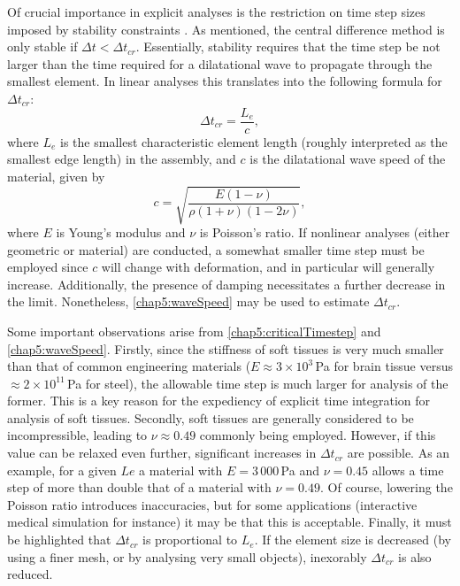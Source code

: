 \bigskip

Of crucial importance in explicit analyses is the restriction on time step sizes imposed by stability constraints \label{chap5:discussionTimestep}. As mentioned, the central difference method is only stable if $ \Delta t <  \Delta t_{cr} $. Essentially, stability requires that the time step be not larger than the time required for a dilatational wave to propagate through the smallest element. In linear analyses this translates into the following formula for $ \Delta t_{cr}$:
\begin{equation}
\label{chap5:criticalTimestep}
\Delta t_{cr} = \dfrac{L_e}{c},
\end{equation}
where $ L_e $ is the smallest characteristic element length (roughly interpreted as the smallest edge length) in the assembly, and $c$ is the dilatational wave speed of the material, given by
\begin{equation}
\label{chap5:waveSpeed}
c = \sqrt{\dfrac{E (1 - \nu)}{\rho (1+\nu)(1-2\nu)}},
\end{equation}
where $E$ is Young's modulus and $\nu$ is Poisson's ratio. If nonlinear analyses (either geometric or material) are conducted, a somewhat smaller time step must be employed since $c$ will change with deformation, and in particular will generally increase. Additionally, the presence of damping necessitates a further decrease in the limit. Nonetheless, \eqref{chap5:waveSpeed} may be used to estimate $ \Delta t_{cr}$. 

Some important observations arise from \eqref{chap5:criticalTimestep} and \eqref{chap5:waveSpeed}. Firstly, since the stiffness of soft tissues is very much smaller than that of common engineering materials ($E \approx 3 \times 10^3\, $Pa for brain tissue versus $\approx 2 \times 10^{11}\, $Pa for steel), the allowable time step is much larger for analysis of the former. This is a key reason for the expediency of explicit time integration for analysis of soft tissues. Secondly, soft tissues are generally considered to be incompressible, leading to $\nu \approx 0.49$ commonly being employed. However, if this value can be relaxed even further, significant increases in $ \Delta t_{cr}$ are possible. As an example, for a given $ Le $ a material with $E = 3\,000\, $Pa and $\nu = 0.45$ allows a time step of more than double that of a material with $\nu = 0.49$. Of course, lowering the Poisson ratio introduces inaccuracies, but for some applications (interactive medical simulation for instance) it may be that this is acceptable. Finally, it must be highlighted that $ \Delta t_{cr}$ is proportional to $ L_e $. If the element size is decreased (by using a finer mesh, or by analysing very small objects), inexorably $ \Delta t_{cr}$ is also reduced. 



